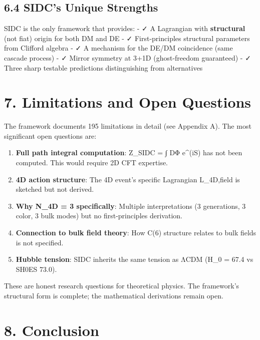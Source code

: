 \hypertarget{sidcs-unique-strengths}{%
\subsection{6.4 SIDC's Unique Strengths}\label{sidcs-unique-strengths}}

SIDC is the only framework that provides: - ✓ A Lagrangian with
\textbf{structural} (not fiat) origin for both DM and DE - ✓
First-principles structural parameters from Clifford algebra - ✓ A
mechanism for the DE/DM coincidence (same cascade process) - ✓ Mirror
symmetry at 3+1D (ghost-freedom guaranteed) - ✓ Three sharp testable
predictions distinguishing from alternatives

\hypertarget{limitations-and-open-questions}{%
\section{7. Limitations and Open
Questions}\label{limitations-and-open-questions}}

The framework documents 195 limitations in detail (see Appendix A). The
most significant open questions are:

\begin{enumerate}
\def\labelenumi{\arabic{enumi}.}
\item
  \textbf{Full path integral computation}: Z\_SIDC = ∫ DΦ e\^{}(iS) has
  not been computed. This would require 2D CFT expertise.
\item
  \textbf{4D action structure}: The 4D event's specific Lagrangian
  L\_4D,field is sketched but not derived.
\item
  \textbf{Why N\_4D = 3 specifically}: Multiple interpretations (3
  generations, 3 color, 3 bulk modes) but no first-principles
  derivation.
\item
  \textbf{Connection to bulk field theory}: How C(6) structure relates
  to bulk fields is not specified.
\item
  \textbf{Hubble tension}: SIDC inherits the same tension as ΛCDM (H\_0
  = 67.4 vs SH0ES 73.0).
\end{enumerate}

These are honest research questions for theoretical physics. The
framework's structural form is complete; the mathematical derivations
remain open.

\hypertarget{conclusion}{%
\section{8. Conclusion}\label{conclusion}}

